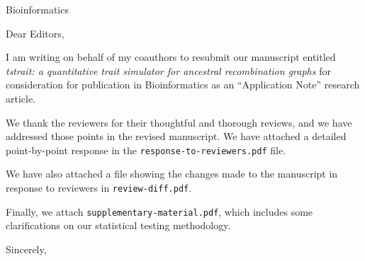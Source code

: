 \documentclass{letter}
\begin{document}
\begin{letter}{Bioinformatics}

\opening{Dear Editors,}

I am writing on behalf of my coauthors to resubmit our manuscript entitled
\emph{tstrait: a quantitative trait simulator for ancestral recombination graphs}
for consideration for publication in Bioinformatics
as an ``Application Note'' research article.

We thank the reviewers for their thoughtful and thorough reviews, and we have addressed those points in the revised manuscript. We have attached
a detailed point-by-point response in the \texttt{response-to-reviewers.pdf}
file.

We have also attached a file showing the changes made to the manuscript
in response to reviewers in \texttt{review-diff.pdf}.

Finally, we attach \texttt{supplementary-material.pdf}, which includes some clarifications on our 
statistical testing methodology.

\closing{Sincerely,}

\end{letter}
\end{document}
